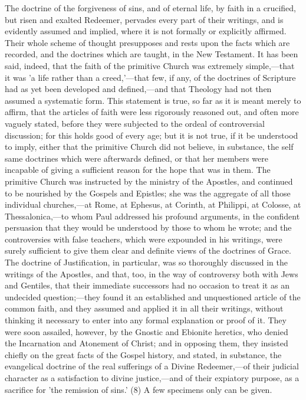 \documentclass[
]{book}
\begin{document}
The doctrine of the forgiveness of sins, and of eternal life, by faith in a crucified, but risen and exalted Redeemer, pervades every part of their writings, and is evidently assumed and implied, where it is not formally or explicitly affirmed. Their whole scheme of thought presupposes and rests upon the facts which are recorded, and the doctrines which are taught, in the New Testament. It has been said, indeed, that the faith of the primitive Church was extremely simple,---that it was 'a life rather than a creed,'---that few, if any, of the doctrines of Scripture had as yet been developed and defined,---and that Theology had not then assumed a systematic form. This statement is true, so far as it is meant merely to affirm, that the articles of faith were less rigorously reasoned out, and often more vaguely stated, before they were subjected to the ordeal of controversial discussion; for this holds good of every age; but it is not true, if it be understood to imply, either that the primitive Church did not believe, in substance, the self same doctrines which were afterwards defined, or that her members were incapable of giving a sufficient reason for the hope that was in them. The primitive Church was instructed by the ministry of the Apostles, and continued to be nourished by the Gospels and Epistles; she was the aggregate of all those individual churches,---at Rome, at Ephesus, at Corinth, at Philippi, at Colosse, at Thessalonica,---to whom Paul addressed his profound arguments, in the confident persuasion that they would be understood by those to whom he wrote; and the controversies with false teachers, which were expounded in his writings, were surely sufficient to give them clear and definite views of the doctrines of Grace. The doctrine of Justification, in particular, was so thoroughly discussed in the writings of the Apostles, and that, too, in the way of controversy both with Jews and Gentiles, that their immediate successors had no occasion to treat it as an undecided question;---they found it an established and unquestioned article of the common faith, and they assumed and applied it in all their writings, without thinking it necessary to enter into any formal explanation or proof of it. They were soon assailed, however, by the Gnostic and Ebionite heretics, who denied the Incarnation and Atonement of Christ; and in opposing them, they insisted chiefly on the great facts of the Gospel history, and stated, in substance, the evangelical doctrine of the real sufferings of a Divine Redeemer,---of their judicial character as a satisfaction to divine justice,---and of their expiatory purpose, as a sacrifice for 'the remission of sins.' (8) A few specimens only can be given.
\end{document}
